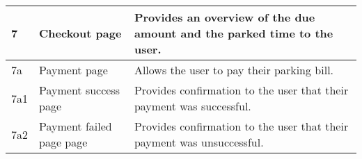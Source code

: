 \begin{table}[ht!]
    \centering
    \begin{tabular}{|p{2cm}|p{4cm}|p{9cm}|}
         \hline
         7 & Checkout page & Provides an overview of the due amount and the parked time to the user.\\
         \hline 
         7a & Payment page & Allows the user to pay their parking bill. \\
         \hline 
         7a1 & Payment success page & Provides confirmation to the user that their payment was successful. \\
         \hline 
         7a2 & Payment failed page page & Provides confirmation to the user that their payment was unsuccessful. \\
         \hline
    \end{tabular}
\end{table}
\clearpage